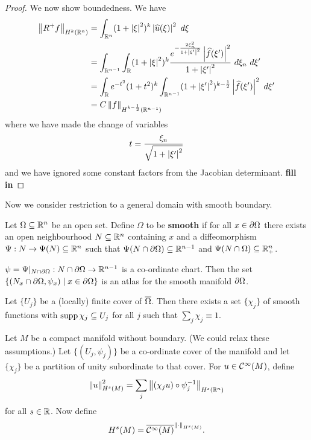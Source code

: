 \begin{proof}
  We now show boundedness.
  We have
  \begin{align*}
    \left\lVert R^+f \right\rVert_{H^k(\mathbb{R}^n)} &= \int_{\mathbb{R}^n} (1+\left\lvert \xi \right\rvert^2)^k \left\lvert \widehat u(\xi) \right\rvert^2 \ d\xi \\
    &= \int_{\mathbb{R}^{n-1}} \int_{\mathbb{R}} (1+\left\lvert \xi \right\rvert^2)^k \frac{e^{-\frac{2\xi_n^2}{1+\left\lvert \xi' \right\rvert^2}}\left\lvert \widehat f(\xi') \right\rvert^2}{1+\left\lvert \xi' \right\rvert^2} \ d\xi_n \ d\xi' \\
    &= \int_{\mathbb{R}} e^{-t^2}(1+t^2)^k \int_{\mathbb{R}^{n-1}} (1+\left\lvert \xi' \right\rvert^2)^{k-\frac12} \left\lvert \widehat f(\xi') \right\rvert^2 \ d\xi' \\
      &= C\left\lVert f \right\rVert_{H^{k-\frac12}(\mathbb{R}^{n-1})}
  \end{align*}
  where we have made the change of variables
  \[ t=\frac{\xi_n}{\sqrt{1+\left\lvert \xi' \right\rvert^2}} \]
  and we have ignored some constant factors from the Jacobian determinant.
  \textbf{fill in}
\end{proof}

Now we consider restriction to a general domain with smooth boundary.

\begin{defn}
  Let $\Omega \subseteq \mathbb{R}^n$ be an open set.
  Define $\Omega$ to be \textbf{smooth} if for all $x\in\partial\Omega$ there exists an open neighbourhood $N \subseteq \mathbb{R}^n$ containing $x$ and a diffeomorphism $\Psi: N \to \Psi(N) \subseteq \mathbb{R}^n$ such that $\Psi(N\cap\partial\Omega)\subseteq\mathbb{R}^{n-1}$ and $\Psi(N\cap\Omega)\subseteq\mathbb{R}_+^n$.
\end{defn}

\begin{rmk}
  $\psi = \Psi|_{N\cap\partial\Omega}: N\cap\partial\Omega \to \mathbb{R}^{n-1}$ is a co-ordinate chart.
  Then the set $\{ (N_x\cap\partial\Omega,\psi_x) \mid x \in \partial\Omega \}$ is an atlas for the smooth manifold $\partial\Omega$.
\end{rmk}

\begin{lem}
  Let $\{U_j\}$ be a (locally) finite cover of $\overline\Omega$.
  Then there exists a set $\{\chi_j\}$ of smooth functions with $\operatorname{supp}\chi_j\subseteq U_j$ for all $j$ such that $\sum_j \chi_j \equiv 1$.
\end{lem}

\begin{defn}
  Let $M$ be a compact manifold without boundary.
  (We could relax these assumptions.)
  Let $\{(U_j,\psi_j)\}$ be a co-ordinate cover of the manifold and let $\{\chi_j\}$ be a partition of unity subordinate to that cover.
  For $u\in\mathcal{C}^\infty(M)$, define
  \[ \left\lVert u \right\rVert_{H^s(M)}^2 = \sum_j \left\lVert (\chi_ju)\circ\psi_j^{-1} \right\rVert_{H^s(\mathbb{R}^n)} \]
  for all $s\in\mathbb{R}$.
  Now define
  \[ H^s(M) = \overline{\mathcal{C}^\infty(M)}^{\left\lVert \cdot \right\rVert_{H^s(M)}}. \]
\end{defn}

